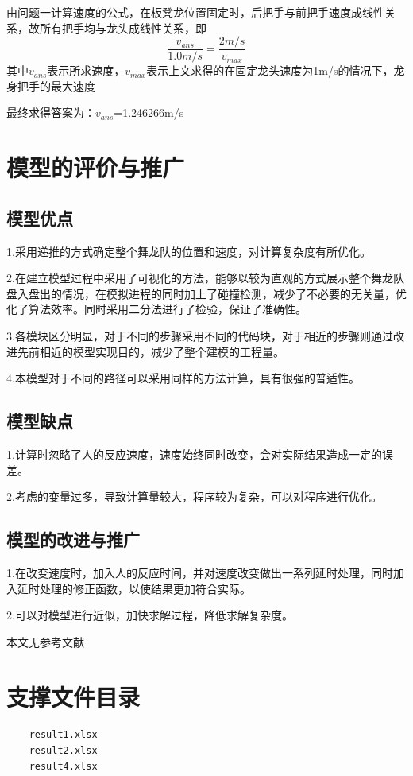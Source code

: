 \documentclass[withoutpreface,bwprint]{cumcmthesis} %
\begin{document}
由问题一计算速度的公式，在板凳龙位置固定时，后把手与前把手速度成线性关系，故所有把手均与龙头成线性关系，即
$$\frac{v_{ans}}{1.0m/s}=   \frac{2m/s}{v_{max}}$$
其中$v_{ans}$表示所求速度，$v_{max}$表示上文求得的在固定龙头速度为1m/s的情况下，龙身把手的最大速度

最终求得答案为：$v_{ans}$=1.246266m/s
\section{模型的评价与推广}
\subsection{模型优点}

1.采用递推的方式确定整个舞龙队的位置和速度，对计算复杂度有所优化。

2.在建立模型过程中采用了可视化的方法，能够以较为直观的方式展示整个舞龙队盘入盘出的情况，在模拟进程的同时加上了碰撞检测，减少了不必要的无关量，优化了算法效率。同时采用二分法进行了检验，保证了准确性。

3.各模块区分明显，对于不同的步骤采用不同的代码块，对于相近的步骤则通过改进先前相近的模型实现目的，减少了整个建模的工程量。

4.本模型对于不同的路径可以采用同样的方法计算，具有很强的普适性。

\subsection{模型缺点}

1.计算时忽略了人的反应速度，速度始终同时改变，会对实际结果造成一定的误差。

2.考虑的变量过多，导致计算量较大，程序较为复杂，可以对程序进行优化。

\subsection{模型的改进与推广}

1.在改变速度时，加入人的反应时间，并对速度改变做出一系列延时处理，同时加入延时处理的修正函数，以使结果更加符合实际。

2.可以对模型进行近似，加快求解过程，降低求解复杂度。

\newpage


本文无参考文献

\newpage
\appendix
\section{支撑文件目录}
\begin{lstlisting}
    result1.xlsx
    result2.xlsx
    result4.xlsx
\end{lstlisting}
\end{document}
